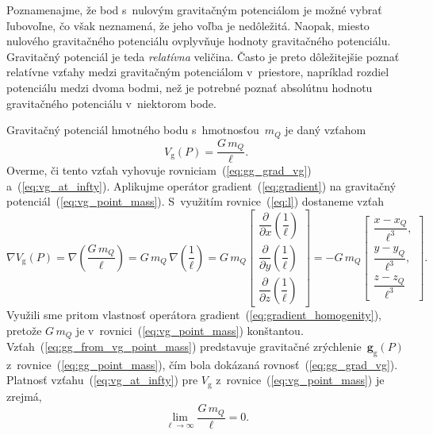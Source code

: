\documentclass[a4paper, 12pt]{book}
\newcommand{\gidx}{\mathrm g}
\let\vec\mathbf
\begin{document}
Poznamenajme, že bod s~nulovým gravitačným potenciálom je možné vybrať 
ľubovoľne, čo však neznamená, že jeho voľba je nedôležitá.  Naopak, miesto 
nulového gravitačného potenciálu ovplyvňuje hodnoty gravitačného potenciálu.  
Gravitačný potenciál je teda \emph{relatívna} veličina.  Často je preto 
dôležitejšie poznať relatívne vzťahy medzi gravitačným potenciálom v~priestore, 
napríklad rozdiel potenciálu medzi dvoma bodmi, než je potrebné poznať 
absolútnu hodnotu gravitačného potenciálu v~niektorom bode.

Gravitačný potenciál hmotného bodu s~hmotnosťou~$m_Q$ je daný vzťahom
%
\begin{equation}
\label{eq:vg_point_mass}
V_\gidx(P) = \frac{G \, m_Q}{\ell}{.}
\end{equation}
%
Overme, či tento vzťah vyhovuje rovniciam~(\ref{eq:gg_grad_vg})
a~(\ref{eq:vg_at_infty}).  Aplikujme operátor gradient~(\ref{eq:gradient})
na gravitačný potenciál~(\ref{eq:vg_point_mass}).  S~využitím 
rovnice~(\ref{eq:l}) dostaneme vzťah
%
\begin{equation}
\label{eq:gg_from_vg_point_mass}
\nabla V_\gidx(P) = \nabla \left( \frac{G \, m_Q}{\ell} \right) = G \, m_Q \, 
\nabla \left( \frac{1}{\ell} \right) =
%
G \, m_Q
%
\begin{bmatrix}
\dfrac{\partial}{\partial x} \left( \dfrac{1}{\ell} \right)\\[2ex]
\dfrac{\partial}{\partial y} \left( \dfrac{1}{\ell} \right)\\[2ex]
\dfrac{\partial}{\partial z} \left( \dfrac{1}{\ell} \right)
\end{bmatrix}
%
=
%
-G \, m_Q
%
\begin{bmatrix}
\dfrac{x - x_Q}{\ell^3}{,}\\[2ex]
\dfrac{y - y_Q}{\ell^3}{,}\\[2ex]
\dfrac{z - z_Q}{\ell^3}
\end{bmatrix}
{.}
\end{equation}
%
Využili sme pritom vlastnosť operátora gradient~(\ref{eq:gradient_homogenity}), 
pretože $G \, m_Q$ je v~rovnici~(\ref{eq:vg_point_mass}) konštantou.  
Vzťah~(\ref{eq:gg_from_vg_point_mass}) predstavuje gravitačné zrýchlenie~$\vec 
g_\gidx(P)$ z~rovnice~(\ref{eq:gg_point_mass}), čím bola dokázaná 
rovnosť~(\ref{eq:gg_grad_vg}).  Platnosť vzťahu~(\ref{eq:vg_at_infty}) pre 
$V_\gidx$ z~rovnice~(\ref{eq:vg_point_mass}) je zrejmá,
%
\begin{equation}
\lim_{\ell \to \infty} \frac{G \, m_Q}{\ell} = 0{.}
\end{equation}
\end{document}
